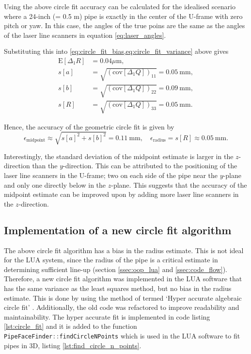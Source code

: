 Using the above circle fit accuracy can be calculated for the idealised scenario where a 24-inch (= 0.5 m) pipe is exactly in the center of the U-frame with zero pitch or yaw. In this case, the angles of the true poins are the same as the angles of the laser line scanners in equation \ref{eq:laser_angles}.

Substituting this into \cref{eq:circle_fit_bias,eq:circle_fit_variance} above gives
\begin{align*}
    \text{E}[\Delta_1 R] & = 0.04 \mu \text{m},                                       \\
    s[a]                 & = \sqrt{(\text{cov}[\Delta_1 Q])_{11}} = 0.05 \ \text{mm}, \\
    s[b]                 & = \sqrt{(\text{cov}[\Delta_1 Q])_{22}} = 0.09 \ \text{mm}, \\
    s[R]                 & = \sqrt{(\text{cov}[\Delta_1 Q])_{33}} = 0.05 \ \text{mm}.
\end{align*}

Hence, the accuracy of the geometric circle fit is given by
\begin{equation}
    \epsilon_{\text{midpoint}} \approx \sqrt{s[a]^2 + s[b]^2 } = 0.11 \ \text{mm}, \quad \epsilon_{\text{radius}} = s[R] \approx 0.05 \ \text{mm}.
    \label{eq:circle_fit_accuracy}
\end{equation}

Interestingly, the standard deviation of the midpoint estimate is larger in the $z$-direction than the $y$-direction. This can be attributed to the positioning of the laser line scanners in the U-frame; two on each side of the pipe near the $y$-plane and only one directly below in the $z$-plane. This suggests that the accuracy of the midpoint estimate can be improved upon by adding more laser line scanners in the $z$-direction.

\subsection{Implementation of a new circle fit algorithm}
The above circle fit algorithm has a bias in the radius estimate. This is not ideal for the LUA system, since the radius of the pipe is a critical estimate in determining sufficient line-up (section \ref{ssec:oop_lua} and \ref{ssec:code_flow}). Therefore, a new circle fit algorithm was implemented in the LUA software that has the same variance as the least squares method, but no bias in the radius estimate. This is done by using the method of \citeauthor{alsharadqah_chernov_circle_fitting} termed `Hyper accurate algebraic circle fit' \cite{alsharadqah_chernov_circle_fitting}. Additionally, the old code was refactored to improve readability and maintainability. The hyper accurate fit is implemented in code listing \ref{lst:circle_fit} and it is added to the function \lstinline[language=C]|PipeFaceFinder::findCircleNPoints| which is used in the LUA software to fit pipes in 3D, listing \ref{lst:find_circle_n_points}.